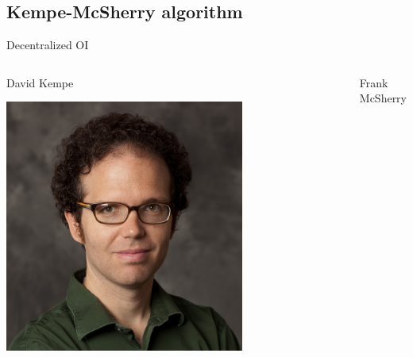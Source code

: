 \documentclass[xcolor=table,final]{beamer} %
\newcommand{\PushSum}{\texttt{PushSum}\xspace}
\begin{document}
\subsection{Kempe-McSherry algorithm}
\begin{frame}{Decentralized OI}%
  \begin{columns}
    \begin{center}
      David Kempe

      \includegraphics[width=0.7\textwidth]{figs/extras/david-kempe}
    \end{center}
    
    \begin{center}
      Frank McSherry


\end{center}
\end{columns}
\end{frame}
\end{document}
